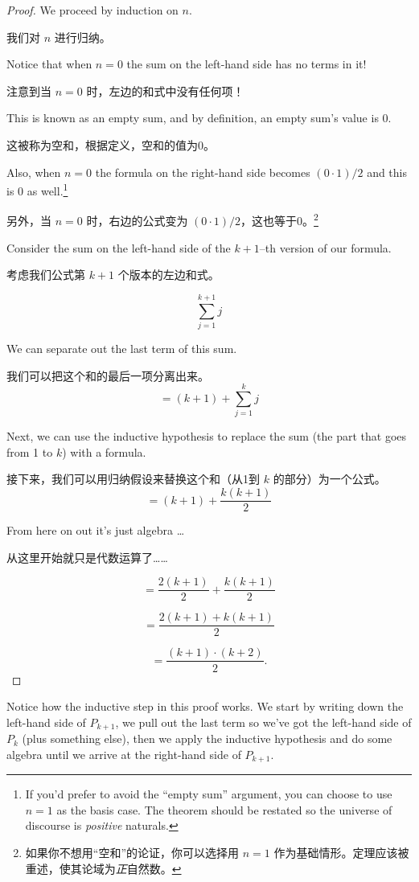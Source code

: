 \begin{proof}
We proceed by induction on $n$.

我们对 $n$ 进行归纳。

  Notice that when $n=0$ the sum on the left-hand side
has no terms in it!

注意到当 $n=0$ 时，左边的和式中没有任何项！

This is known as an  empty sum, and by 
definition, an empty sum's value is $0$.

这被称为空和，根据定义，空和的值为0。

Also, when 
$n=0$ the formula on the right-hand side becomes $(0 \cdot 1)/2$ and this is 
$0$ as well.\footnote{If you'd prefer to avoid the ``empty sum'' argument, %
you can choose to use $n=1$ as the basis case.
The theorem should %
be restated so the universe of discourse is \emph{positive} naturals.}

另外，当 $n=0$ 时，右边的公式变为 $(0 \cdot 1)/2$，这也等于0。\footnote{如果你不想用“空和”的论证，你可以选择用 $n=1$ 作为基础情形。定理应该被重述，使其论域为\emph{正}自然数。}

  Consider the sum on the left-hand side of
the $k+1$--th version of our formula.

考虑我们公式第 $k+1$ 个版本的左边和式。

\[ \sum_{j=1}^{k+1} j \]

We can separate out the last term of this sum.

我们可以把这个和的最后一项分离出来。
\[ = (k+1) + \sum_{j=1}^{k} j \]

Next, we can use the inductive hypothesis to replace the sum (the part 
that goes from 1 to $k$) with a formula.

接下来，我们可以用归纳假设来替换这个和（从1到 $k$ 的部分）为一个公式。
\[ = (k+1) + \frac{k(k+1)}{2} \]

From here on out it's just algebra \ldots

从这里开始就只是代数运算了……

\[ = \frac{2(k+1)}{2} + \frac{k(k+1)}{2} \]

\[ = \frac{2(k+1) + k(k+1)}{2} \]

\[ = \frac{(k+1) \cdot (k+2)}{2}.
\]

\end{proof}
\medskip

Notice how the inductive step in this proof works.  We start by writing
down the left-hand side of $P_{k+1}$, we pull out the last term
so we've got the left-hand side of $P_{k}$ (plus something else), then
we apply the inductive hypothesis and do some algebra until we arrive
at the right-hand side of $P_{k+1}$.

